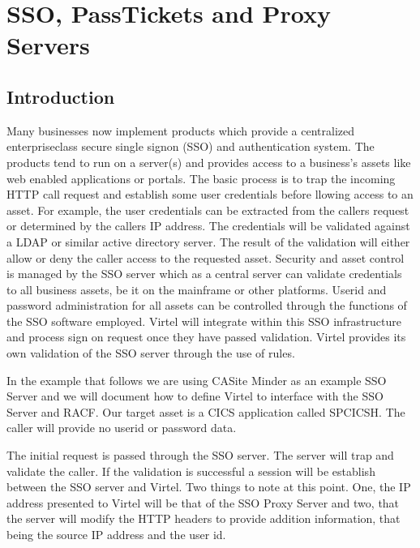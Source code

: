 \documentclass[letterpaper,10pt,english]{sphinxmanual}
\begin{document}
\chapter{SSO, PassTickets and Proxy Servers}
\label{\detokenize{connectivity_guide:sso-passtickets-and-proxy-servers}}

\section{Introduction}
\label{\detokenize{connectivity_guide:id74}}
\sphinxAtStartPar
Many businesses now implement products which provide a centralized enterprise\sphinxhyphen{}class secure single sign\sphinxhyphen{}on (SSO) and authentication system. The products tend to run on a server(s) and provides access to a business’s assets like web enabled applications or portals. The basic process is to trap the incoming HTTP call request and establish some user credentials before llowing access to an asset. For example, the user credentials can be extracted from the callers request or determined by the callers IP address. The credentials will be validated against a LDAP or similar active directory server. The result of the validation will either allow or deny the caller access to the requested asset. Security and asset control is managed by the SSO server which as a central server can validate credentials to all business assets, be it on the mainframe or other platforms. Userid and password administration for all assets can be controlled through the functions of the SSO software employed. Virtel will integrate within this SSO infrastructure and process sign on request once they have passed validation. Virtel provides its own validation of the SSO server through the use of rules.

\sphinxAtStartPar
In the example that follows we are using CA\sphinxhyphen{}Site Minder as an example SSO Server and we will document how to define Virtel to interface with the SSO Server and RACF. Our target asset is a CICS application called SPCICSH. The caller will provide no userid or password data.

\sphinxAtStartPar
{} 

\sphinxAtStartPar
The initial request is passed through the SSO server. The server will trap and validate the caller. If the validation is successful a session will be establish between the SSO server and Virtel. Two things to note at this point. One, the IP address presented to Virtel will be that of the SSO Proxy Server and two, that the server will modify the HTTP headers to provide addition information, that being the source IP address and the user id.
\end{document}
